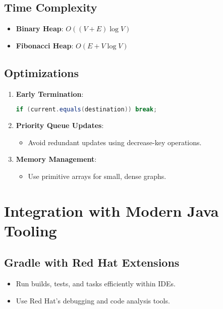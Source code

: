 \documentclass{article}
\begin{document}
\subsection{Time Complexity}

\begin{itemize}
    \item \textbf{Binary Heap}: $O((V + E) \log V)$
    \item \textbf{Fibonacci Heap}: $O(E + V \log V)$
\end{itemize}

\subsection{Optimizations}

\begin{enumerate}
    \item \textbf{Early Termination}:

\begin{lstlisting}[language=Java]
if (current.equals(destination)) break;
\end{lstlisting}

    \item \textbf{Priority Queue Updates}:
    \begin{itemize}
        \item Avoid redundant updates using decrease-key operations.
    \end{itemize}
    \item \textbf{Memory Management}:
    \begin{itemize}
        \item Use primitive arrays for small, dense graphs.
    \end{itemize}
\end{enumerate}

\section{Integration with Modern Java Tooling}

\subsection{Gradle with Red Hat Extensions}

\begin{itemize}
    \item Run builds, tests, and tasks efficiently within IDEs.
    \item Use Red Hat’s debugging and code analysis tools.
\end{itemize}
\end{document}
